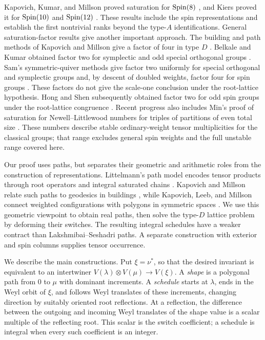 Kapovich, Kumar, and Millson proved saturation
for $\operatorname{Spin}(8)$ \cite[Theorem~5.3]{KKM09}, and Kiers proved it for $\operatorname{Spin}(10)$ and
$\operatorname{Spin}(12)$ \cite[Theorem~1.3]{Kiers19}. These results include the
spin representations and establish the first nontrivial ranks beyond
the type-$A$ identifications. General saturation-factor results give
another important approach. The building and path methods of
Kapovich and Millson give a factor of four in type $D$
\cite[Theorem~1.1]{KM08}. Belkale and Kumar obtained factor two for
symplectic and odd special orthogonal groups \cite{BK10}. Sam's
symmetric-quiver methods give factor two uniformly for special
orthogonal and symplectic groups and, by descent of doubled weights,
factor four for spin groups
\cite[Theorem~1.1 and Corollary~1.2]{Sam12}. These factors do not give
the scale-one conclusion under the root-lattice hypothesis.
Hong and Shen subsequently obtained factor two for odd spin groups
under the root-lattice congruence \cite[Corollary~1.3]{HS15}.
Recent progress also includes Min's proof of saturation for
Newell--Littlewood numbers for triples of partitions of even total
size \cite[Theorem~1.2]{Min24}. These numbers describe stable
ordinary-weight tensor multiplicities for the classical groups;
that range excludes general spin weights and the full unstable
range covered here.

Our proof uses paths, but separates their geometric and arithmetic
roles from the construction of representations. Littelmann's path
model encodes tensor products through root operators and integral
saturated chains \cite{Lit94,Lit95}. Kapovich and Millson relate such
paths to geodesics in buildings \cite{KM08}, while Kapovich, Leeb, and
Millson connect weighted configurations with polygons in symmetric
spaces \cite{KLM09}. We use this geometric viewpoint to obtain real
paths, then solve the type-$D$ lattice problem by deforming their
switches. The resulting integral schedules have a weaker contract than
Lakshmibai--Seshadri paths. A separate construction with exterior and
spin columns supplies tensor occurrence.

We describe the main constructions. Put $\xi=\nu^*$, so that the
desired invariant is equivalent to an intertwiner
$V(\lambda)\otimes V(\mu)\longrightarrow V(\xi)$.
A \emph{shape} is a polygonal path from $0$ to $\mu$ with dominant
increments. A \emph{schedule} starts at $\lambda$, ends in the Weyl
orbit of $\xi$, and follows Weyl translates of these increments,
changing direction by suitably oriented root reflections. At a
reflection, the difference between the outgoing and incoming Weyl
translates of the shape value is a scalar multiple of the reflecting
root. This scalar is the switch coefficient; a schedule is integral
when every such coefficient is an integer.

